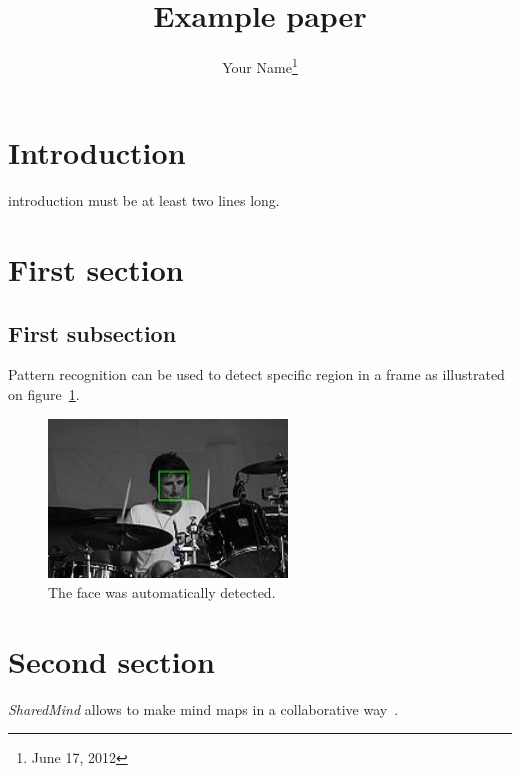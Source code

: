 \documentclass[12pt,compsoc]{IEEEtran}
\title{Example paper}
\author{Your Name\thanks{June 17, 2012}}
\begin{document}

\maketitle

\IEEEdisplaynotcompsoctitleabstractindextext
\IEEEpeerreviewmaketitle


\section{Introduction}
 introduction must be at least two lines long.

\section{First section}
\subsection{First subsection}
Pattern recognition can be used to detect specific region in a frame as illustrated on figure~\ref{fig:face}.

\begin{figure}[h]
\centering
\includegraphics[width=2.5in]{face}
\caption{The face was automatically detected.}
\label{fig:face}
\end{figure}

\section{Second section}
\emph{SharedMind} allows to make mind maps in a collaborative way~\cite{sharedmind}.
\end{document}
